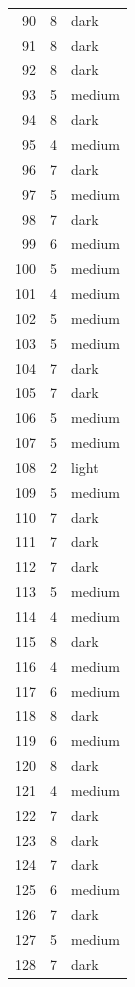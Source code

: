 \begin{tabular}{rrl}
90 & 8 & dark \\
91 & 8 & dark \\
92 & 8 & dark \\
93 & 5 & medium \\
94 & 8 & dark \\
95 & 4 & medium \\
96 & 7 & dark \\
97 & 5 & medium \\
98 & 7 & dark \\
99 & 6 & medium \\
100 & 5 & medium \\
101 & 4 & medium \\
102 & 5 & medium \\
103 & 5 & medium \\
104 & 7 & dark \\
105 & 7 & dark \\
106 & 5 & medium \\
107 & 5 & medium \\
108 & 2 & light \\
109 & 5 & medium \\
110 & 7 & dark \\
111 & 7 & dark \\
112 & 7 & dark \\
113 & 5 & medium \\
114 & 4 & medium \\
115 & 8 & dark \\
116 & 4 & medium \\
117 & 6 & medium \\
118 & 8 & dark \\
119 & 6 & medium \\
120 & 8 & dark \\
121 & 4 & medium \\
122 & 7 & dark \\
123 & 8 & dark \\
124 & 7 & dark \\
125 & 6 & medium \\
126 & 7 & dark \\
127 & 5 & medium \\
128 & 7 & dark \\
\bottomrule
\end{tabular}
